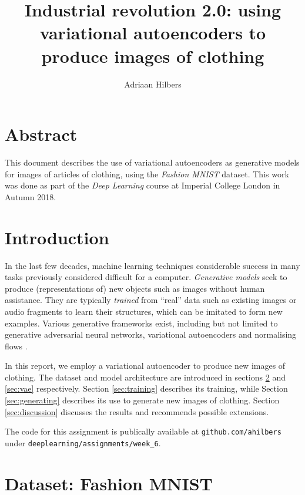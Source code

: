 \documentclass[]{article}
\title{Industrial revolution 2.0: using variational autoencoders to produce images of clothing}
\author{Adriaan Hilbers}
\begin{document}
\maketitle




\section*{Abstract}
\label{sec:abstrct}

This document describes the use of variational autoencoders as generative models for images of articles of clothing, using the \textit{Fashion MNIST} dataset. This work was done as part of the \textit{Deep Learning} course at Imperial College London in Autumn 2018.




\section{Introduction}
\label{sec:introduction}

In the last few decades, machine learning techniques considerable success in many tasks previously considered difficult for a computer. \textit{Generative models} seek to produce (representations of) new objects such as images without human assistance. They are typically \textit{trained} from ``real'' data such as existing images or audio fragments to learn their structures, which can be imitated to form new examples. Various generative frameworks exist, including but not limited to generative adversarial neural networks, variational autoencoders and normalising flows \cite{notes}. 

In this report, we employ a variational autoencoder to produce new images of clothing. The dataset and model architecture are introduced in sections \ref{sec:dataset} and \ref{sec:vae} respectively. Section \ref{sec:training} describes its training, while Section \ref{sec:generating} describes its use to generate new images of clothing. Section \ref{sec:discussion} discusses the results and recommends possible extensions.

The code for this assignment is publically available at \texttt{github.com/ahilbers} under \texttt{deeplearning/assignments/week\_6}. 




\section{Dataset: Fashion MNIST}
\label{sec:dataset}
\end{document}
